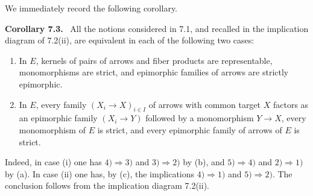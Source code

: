 \documentclass[11pt]{article}
\newenvironment{statement}[1]{\par\medskip\noindent\textbf{#1.}\ }{\par\medskip}
\begin{document}
We immediately record the following corollary.

\begin{statement}{Corollary 7.3}
All the notions considered in 7.1, and recalled in the implication diagram of 7.2(ii), are equivalent in each of the following two cases:
\begin{enumerate}[label=(\roman*)]
\item In $E$, kernels of pairs of arrows and fiber products are representable, monomorphisms are strict, and epimorphic families of arrows are strictly epimorphic.
\item In $E$, every family $(X_i\to X)_{i\in I}$ of arrows with common target $X$ factors as an epimorphic family $(X_i\to Y)$ followed by a monomorphism $Y\to X$, every monomorphism of $E$ is strict, and every epimorphic family of arrows of $E$ is strict.
\end{enumerate}
\end{statement}

Indeed, in case (i) one has $4)\Rightarrow3)$ and $3)\Rightarrow2)$ by (b), and $5)\Rightarrow4)$ and $2)\Rightarrow1)$ by (a). In case (ii) one has, by (c), the implications $4)\Rightarrow1)$ and $5)\Rightarrow2)$. The conclusion follows from the implication diagram 7.2(ii).
\end{document}

